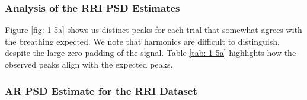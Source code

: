 \documentclass[12pt]{article}
\begin{document}
	\subsubsection{Analysis of the RRI PSD Estimates}
	
	Figure \ref{fig: 1-5a} shows us distinct peaks for each trial that somewhat agrees with the breathing expected. We note that harmonics are difficult to distinguish, despite the large zero padding of the signal. Table \ref{tab: 1-5a} highlights how the observed peaks align with the expected peaks.
	\pagebreak
	
	\subsubsection{AR PSD Estimate for the RRI Dataset}
	
\end{document}
